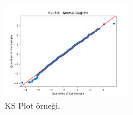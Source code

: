 \begin{figure}[h]
    \centering
    \includegraphics[width=0.5\textwidth]{images/ks_plot.png}
    \caption{KS Plot örneği.}
    \label{fig:enter-label}
\end{figure}

\newpage 